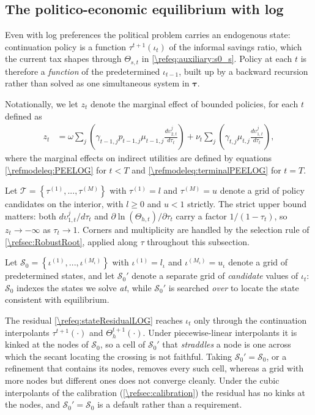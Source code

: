 \subsection{The politico-economic equilibrium with log}\label{\refsec:PEELOG}
Even with log preferences the political problem carries an endogenous state: continuation policy is a function $\tau^{t+1}(\iota_t)$ of the informal savings ratio, which the current tax shapes through $\Theta_{s,t}$ in \eqref{\refeq:auxiliary:s0_s}. Policy at each $t$ is therefore a \emph{function} of the predetermined $\iota_{t-1}$, built up by a backward recursion rather than solved as one simultaneous system in $\bm{\tau}$.

Notationally, we let $z_t$ denote the marginal effect of bounded policies, for each $t$ defined as
\begin{align}\label{\refeq:focbounded}
    z_t &= \omega\sum_{j}\left(\gamma_{t-1,j}p_{t-1,j}\mu_{t-1,j} \frac{d\upsilon_{2,t}^j}{d\tau_t}\right)+\nu_t\sum_j\left(\gamma_{t,j}\mu_{t,j} \frac{d\upsilon_{1,t}^j}{d\tau_t}\right),
\end{align}
where the marginal effects on indirect utilities are defined by equations \eqref{\refmodeleq:PEELOG} for $t<T$ and \eqref{\refmodeleq:terminalPEELOG} for $t=T$.

Let $\mathcal{T} = \left\lbrace \tau^{(1)},...,\tau^{(M)}\right\rbrace$ with $\tau^{(1)} = l$ and $\tau^{(M)} = u$ denote a grid of policy candidates on the interior, with $l\geq 0$ and $u<1$ strictly. The strict upper bound matters: both $d\upsilon_{1,t}^j/d\tau_t$ and $\partial\ln(\Theta_{h,t})/\partial\tau_t$ carry a factor $1/(1-\tau_t)$, so $z_t\rightarrow -\infty$ as $\tau_t\rightarrow 1$. Corners and multiplicity are handled by the selection rule of \cref{\refsec:RobustRoot}, applied along $\tau$ throughout this subsection.

Let $\mathcal{S}_0 = \left\lbrace\iota^{(1)},...,\iota^{(M_{\iota})}\right\rbrace$ with $\iota^{(1)} = l_{\iota}$ and $\iota^{(M_{\iota})} = u_{\iota}$ denote a grid of predetermined states, and let $\mathcal{S}_0'$ denote a separate grid of \emph{candidate} values of $\iota_t$: $\mathcal{S}_0$ indexes the states we solve \emph{at}, while $\mathcal{S}_0'$ is searched \emph{over} to locate the state consistent with equilibrium.

The residual \eqref{\refeq:stateResidualLOG} reaches $\iota_t$ only through the continuation interpolants $\tau^{t+1}(\cdot)$ and $\Theta_h^{t+1}(\cdot)$. Under piecewise-linear interpolants it is kinked at the nodes of $\mathcal{S}_0$, so a cell of $\mathcal{S}_0'$ that \emph{straddles} a node is one across which the secant locating the crossing is not faithful. Taking $\mathcal{S}_0' = \mathcal{S}_0$, or a refinement that contains its nodes, removes every such cell, whereas a grid with more nodes but different ones does not converge cleanly. Under the cubic interpolants of the calibration (\cref{\refsec:calibration}) the residual has no kinks at the nodes, and $\mathcal{S}_0'=\mathcal{S}_0$ is a default rather than a requirement.

